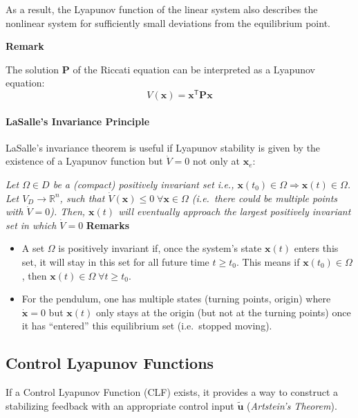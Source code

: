 \newpar{}
As a result, the Lyapunov function of the linear system also describes the nonlinear system for sufficiently small deviations from the equilibrium point.

\newpar{}
\textbf{Remark}

The solution $\mathbf{P}$ of the Riccati equation can be interpreted as a Lyapunov equation:
\noindent\begin{equation*}
    V(\mathbf{x}) = \mathbf{x}^{\mathsf{T}} \mathbf{Px}
\end{equation*}

\paragraph{LaSalle's Invariance Principle}
LaSalle's invariance theorem is useful if Lyapunov stability is given by the existence of a Lyapunov function but $\dot{V}=0$ not only at $\mathbf{x}_e$:

\newpar{}
\textit{Let $\Omega\in D$ be a (compact) positively invariant set i.e., $\mathbf{x}(t_0)\in \Omega \Rightarrow \mathbf{x}(t)\in\Omega$.
    Let $V_D\to \mathbb{R}^n$, such that $\dot{V}(\mathbf{x})\leq 0\; \forall \mathbf{x}\in \Omega$ (i.e.\ there could be multiple points with $\dot{V}=0$).
    Then, $\mathbf{x}(t)$ will eventually approach the largest positively invariant set in which $\dot{V}=0$
}
\newpar{}
\textbf{Remarks}
\begin{itemize}
    \item A set $\Omega$ is positively invariant if, once the system's state $\mathbf{x}(t)$ enters this set, it will stay in this set for all future time $t \geq t_0$. This means if $\mathbf{x}(t_0) \in \Omega$, then $\mathbf{x}(t) \in \Omega\; \forall t \geq t_0$.
    \item For the pendulum, one has multiple states (turning points, origin) where $\dot{\mathbf{x}}=0$ but $\mathbf{x}(t)$ only stays at the origin (but not at the turning points) once it has ``entered'' this equilibrium set (i.e.\ stopped moving).
\end{itemize}

\subsection{Control Lyapunov Functions}
If a Control Lyapunov Function (CLF) exists, it provides a way to construct a stabilizing feedback with an appropriate control input $\tilde{\mathbf{u}}$ (\textit{Artstein's Theorem}).

